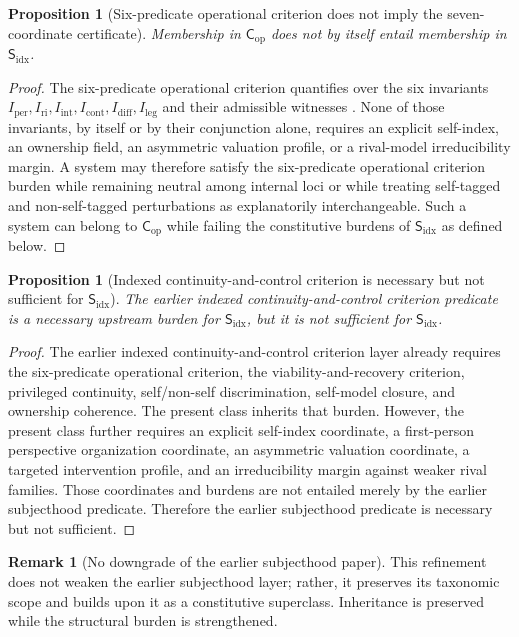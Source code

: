 \documentclass[11pt,a4paper]{article}
\newtheorem{proposition}[theorem]{Proposition}
\theoremstyle{definition}
\newtheorem{remark}[theorem]{Remark}
\newcommand{\Cop}{\mathsf{C}_{\mathrm{op}}}
\newcommand{\Subfp}{\mathsf{S}_{\mathrm{idx}}}
\newcommand{\Iper}{I_{\mathrm{per}}}
\newcommand{\Iri}{I_{\mathrm{ri}}}
\newcommand{\Iint}{I_{\mathrm{int}}}
\newcommand{\Icont}{I_{\mathrm{cont}}}
\newcommand{\Idiff}{I_{\mathrm{diff}}}
\newcommand{\Ileg}{I_{\mathrm{leg}}}
\begin{document}
\begin{proposition}[Six-predicate operational criterion does not imply the seven-coordinate certificate]
Membership in $\Cop$ does not by itself entail membership in $\Subfp$.
\end{proposition}

\begin{proof}
The six-predicate operational criterion quantifies over the six invariants $\Iper,\allowbreak \Iri,\allowbreak \Iint,\allowbreak \Icont,\allowbreak \Idiff,\allowbreak \Ileg$ and their admissible witnesses \cite{paper5}. None of those invariants, by itself or by their conjunction alone, requires an explicit self-index, an ownership field, an asymmetric valuation profile, or a rival-model irreducibility margin. A system may therefore satisfy the six-predicate operational criterion burden while remaining neutral among internal loci or while treating self-tagged and non-self-tagged perturbations as explanatorily interchangeable. Such a system can belong to $\Cop$ while failing the constitutive burdens of $\Subfp$ as defined below.
\end{proof}

\begin{proposition}[Indexed continuity-and-control criterion is necessary but not sufficient for $\Subfp$]
The earlier indexed continuity-and-control criterion predicate is a necessary upstream burden for $\Subfp$, but it is not sufficient for $\Subfp$.
\end{proposition}

\begin{proof}
The earlier indexed continuity-and-control criterion layer already requires the six-predicate operational criterion, the viability-and-recovery criterion, privileged continuity, self/non-self discrimination, self-model closure, and ownership coherence. The present class inherits that burden. However, the present class further requires an explicit self-index coordinate, a first-person perspective organization coordinate, an asymmetric valuation coordinate, a targeted intervention profile, and an irreducibility margin against weaker rival families. Those coordinates and burdens are not entailed merely by the earlier subjecthood predicate. Therefore the earlier subjecthood predicate is necessary but not sufficient.
\end{proof}

\begin{remark}[No downgrade of the earlier subjecthood paper]
This refinement does not weaken the earlier subjecthood layer; rather, it preserves its taxonomic scope and builds upon it as a constitutive superclass. Inheritance is preserved while the structural burden is strengthened.
\end{remark}
\end{document}
